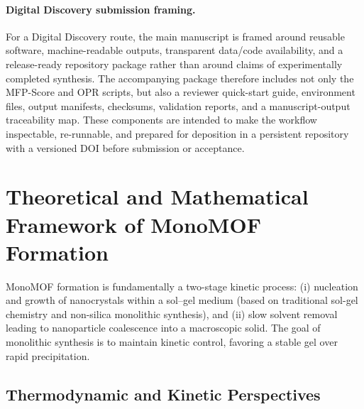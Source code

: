 \documentclass[12pt,a4paper]{article}
\begin{document}
\paragraph{Digital Discovery submission framing.} For a Digital Discovery route, the main manuscript is framed around reusable software, machine-readable outputs, transparent data/code availability, and a release-ready repository package rather than around claims of experimentally completed synthesis. The accompanying package therefore includes not only the MFP-Score and OPR scripts, but also a reviewer quick-start guide, environment files, output manifests, checksums, validation reports, and a manuscript-output traceability map. These components are intended to make the workflow inspectable, re-runnable, and prepared for deposition in a persistent repository with a versioned DOI before submission or acceptance.


\section{Theoretical and Mathematical Framework of MonoMOF Formation}

MonoMOF formation is fundamentally a two-stage kinetic process: (i) nucleation and growth of nanocrystals within a sol–gel medium (based on traditional sol-gel chemistry\cite{ref11} and non-silica monolithic synthesis\cite{ref12}), and (ii) slow solvent removal leading to nanoparticle coalescence into a macroscopic solid. The goal of monolithic synthesis is to maintain kinetic control, favoring a stable gel over rapid precipitation.

\subsection{Thermodynamic and Kinetic Perspectives}
\end{document}

